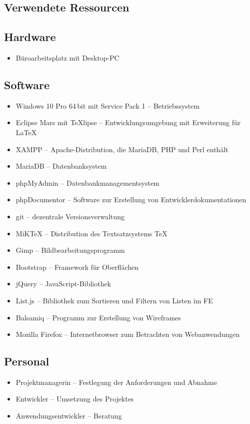 \subsection{Verwendete Ressourcen}
\label{app:Verwendete Ressourcen}

\subsection*{Hardware}
\begin{itemize}
	\item Büroarbeitsplatz mit Desktop-PC
\end{itemize}

\subsection*{Software}
\begin{itemize}
	\item Windows 10 Pro 64\,bit mit Service Pack 1 -- Betriebssystem
	\item Eclipse Mars mit TeXlipse -- Entwicklungsumgebung mit Erweiterung für
	\LaTeX
	\item \acs{XAMPP} -- Apache-Distribution, die MariaDB, PHP und Perl enthält
	\item MariaDB -- Datenbanksystem
	\item phpMyAdmin -- Datenbankmanagementsystem
	\item phpDocumentor -- Software zur Erstellung von Entwicklerdokumentationen
	\item git -- dezentrale Versionsverwaltung
	\item MiKTeX -- Distribution des Textsatzsystems \TeX
	\item Gimp -- Bildbearbeitungsprogramm
	\item Bootstrap -- Framework für Oberflächen 
	\item jQuery -- JavaScript-Bibliothek
	\item List.js -- Bibliothek zum Sortieren und Filtern von Listen im \acs{FE}
	\item Balsamiq -- Programm zur Erstellung von Wireframes
	\item Mozilla Firefox -- Internetbrowser zum Betrachten von Webanwendungen
\end{itemize}

\subsection*{Personal}
\begin{itemize}
	\item Projektmanagerin -- Festlegung der Anforderungen und Abnahme  
	\item Entwickler -- Umsetzung des Projektes
	\item Anwendungsentwickler -- Beratung
\end{itemize}